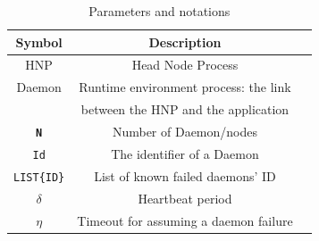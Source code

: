 \documentclass[sigconf]{acmart}
\begin{document}
\begin{table}
  \caption{Parameters and notations}
  \label{tab:parameters}
  \begin{tabular}{ccl}
    \toprule
    Symbol & Description \\
    \midrule
    HNP & Head Node Process \\
    Daemon & Runtime environment process: the link  \\&  between the HNP and the application \\
    \texttt{\bf N} & Number of Daemon/nodes \\
    \texttt{Id} & The identifier of a Daemon \\
    \texttt{LIST\{ID\}} & List of known failed daemons' ID \\
    $\delta$ & Heartbeat period \\
    $\eta$ & Timeout for assuming a daemon failure\\
    \bottomrule
  \end{tabular}
\end{table}
\end{document}
